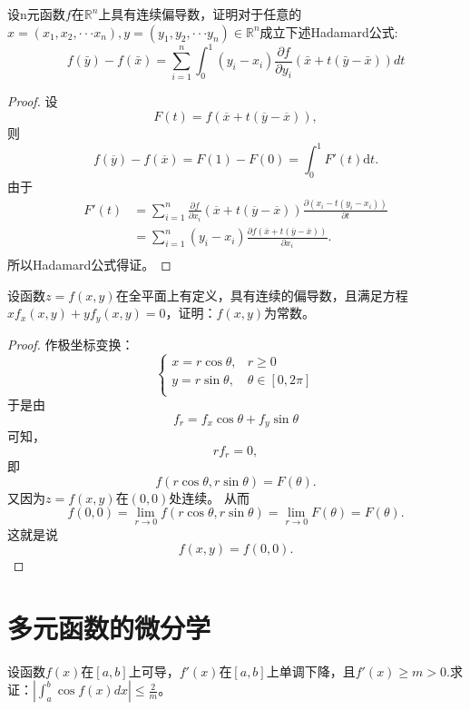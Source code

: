 	\begin{exercise}
  设n元函数$f$在$\mathbb R^n$上具有连续偏导数，证明对于任意的$x=(x_1,x_2,\cdot\cdot\cdot x_n),y=(y_1,y_2,\cdot\cdot\cdot y_n)\in \mathbb R^n$成立下述Hadamard公式:
  $$\displaystyle f(\bar{y})-f(\bar{x})=\sum_{i=1}^n\int_0^1(y_i-x_i)\frac{\partial f}{\partial y_i}(\bar{x}+t(\bar{y}-\bar{x}))dt$$
  \end{exercise}
  
  \begin{proof}
设$$F(t)=f(\overline{x}+t(\overline{y}-\overline{x})),$$
则$$f(\overline{y})-f(\overline{x})=F(1)-F(0)=\int_0^1F'(t)\mathrm{d}t.$$
由于
\begin{align*}
F'(t)&=\sum_{i=1}^n\frac{\partial f}{\partial x_i}(\overline{x}+t(\overline{y}-\overline{x}))\frac{\partial(x_i-t(y_i-x_i))}{\partial t}\\
&=\sum_{i=1}^n(y_i-x_i)\frac{\partial f(\overline{x}+t(\overline{y}-\overline{x}))}{\partial x_i}.\\
\end{align*}
所以Hadamard公式得证。
	\end{proof}

	\begin{exercise}
  设函数$z=f(x,y)$在全平面上有定义，具有连续的偏导数，且满足方程$xf_x(x,y)+yf_y(x,y)=0$，证明：$f(x,y)$为常数。
  \end{exercise}	
  
  \begin{proof}
	作极坐标变换：
	$$
	\begin{cases}
	x=r\cos\theta,&r\geq0\\
	y=r\sin\theta,&\theta\in[0,2\pi]\\
	\end{cases}	
	$$
	于是由$$f_r=f_x\cos\theta+f_y\sin\theta$$可知，$$rf_r=0,$$
	即$$f(r\cos\theta,r\sin\theta)=F(\theta).$$
	又因为$z=f(x,y)$在$(0,0)$处连续。
	从而$$f(0,0)=\lim_{r\rightarrow0}f(r\cos\theta,r\sin\theta)=\lim_{r\rightarrow0}F(\theta)=F(\theta).$$
	这就是说$$f(x,y)=f(0,0).$$
	\end{proof}
  
\section{多元函数的微分学}

\begin{exercise}
设函数$f(x)$在$[a,b]$上可导，$f'(x)$在$[a,b]$上单调下降，且$f'(x)\geq m>0.$求证：$|\int_a^b\cos f(x)dx|\leq\frac 2m$。
\end{exercise}

